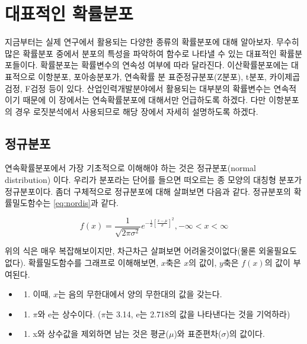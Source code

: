 \documentclass[
]{book}
\providecommand{\tightlist}{%
  \setlength{\itemsep}{0pt}\setlength{\parskip}{0pt}}
\begin{document}
\section{대표적인 확률분포}\label{uxb300uxd45cuxc801uxc778-uxd655uxb960uxbd84uxd3ec}

지금부터는 실제 연구에서 활용되는 다양한 종류의 확률분포에 대해 알아보자. 무수히 많은 확률분포 중에서 분포의 특성을 파악하여 함수로 나타낼 수 있는 대표적인 확률분포들이다. 확률분포는 확률변수의 연속성 여부에 따라 달라진다. 이산확률분포에는 대표적으로 이항분포, 포아송분포가, 연속확률 분 표준정규분포(Z분포), t분포, 카이제곱검정, F검정 등이 있다. 산업인력개발분야에서 활용되는 대부분의 확률변수는 연속적이기 때문에 이 장에서는 연속확률분포에 대해서만 언급하도록 하겠다. 다만 이항분포의 경우 로짓분석에서 사용되므로 해당 장에서 자세히 설명하도록 하겠다.

\subsection{정규분포}\label{uxc815uxaddcuxbd84uxd3ec}

연속확률분포에서 가장 기초적으로 이해해야 하는 것은 정규분포(normal distribution) 이다. 우리가 분포라는 단어를 들으면 떠오르는 종 모양의 대칭형 분포가 정규분포이다. 좀더 구체적으로 정규분포에 대해 살펴보면 다음과 같다.
정규분포의 확률밀도함수는 \eqref{eq:nordis}과 같다.

\begin{equation}
f(x) = \frac{1}{\sqrt{2\pi \sigma^{2}}} e^{-\frac{1}{2}\left [ \frac{x-\mu }{\sigma } \right ]^{2}},   -\infty<x<\infty
\label{eq:nordis}
\end{equation}

위의 식은 매우 복잡해보이지만, 차근차근 살펴보면 어려울것이없다(물론 외울필요도 없다). 확률밀도함수를 그래프로 이해해보면, \(x\)축은 \(x\)의 값이, \(y\)축은 \(f(x)\)의 값이 부여된다.

\begin{itemize}
\tightlist
\item
  \begin{enumerate}
  \def\labelenumi{(\arabic{enumi})}
  \tightlist
  \item
    이때, \(x\)는 음의 무한대에서 양의 무한대의 값을 갖는다.
  \end{enumerate}
\item
  \begin{enumerate}
  \def\labelenumi{(\arabic{enumi})}
  \setcounter{enumi}{1}
  \tightlist
  \item
    \(\pi\)와 e는 상수이다. (\(\pi\)는 3.14, e는 2.718의 값을 나타낸다는 것을 기억하라)
  \end{enumerate}
\item
  \begin{enumerate}
  \def\labelenumi{(\arabic{enumi})}
  \setcounter{enumi}{2}
  \tightlist
  \item
    x와 상수값을 제외하면 남는 것은 평균(\(\mu\))와 표준편차(\(\sigma\))의 값이다.
  \end{enumerate}
\end{itemize}
\end{document}
